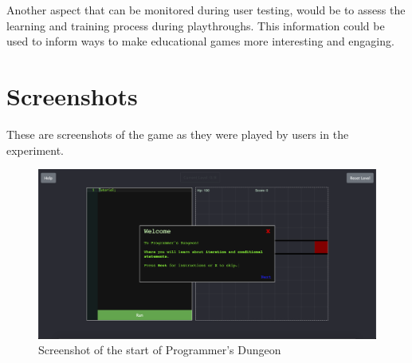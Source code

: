 \documentclass[a4paper,11.5pt]{report}
\numberwithin{figure}{section}
\numberwithin{table}{section}
\numberwithin{equation}{section}
\numberwithin{equation}{section}
\newcommand\blankpage{%
    \null
    \thispagestyle{empty}%
    \addtocounter{page}{-1}%
    \newpage}
\begin{document}
Another aspect that can be monitored during user testing, would be to assess the learning and training process during playthroughs. This information could be used to inform ways to make educational games more interesting and engaging.


\afterpage{\blankpage}






\appendix
{}
\appendixpage

\renewcommand\chaptername{Appendix}

\newpage

\chapter{Screenshots} \label{app:screenshots}

These are screenshots of the game as they were played by users in the experiment. 

\begin{figure}[H]
 \centering
    \includegraphics[width=1\textwidth]{startgame}
       \captionsetup{justification=centering}
\caption{Screenshot of the start of Programmer's Dungeon}
\label{fig:startgame}
\end{figure}
\end{document}
